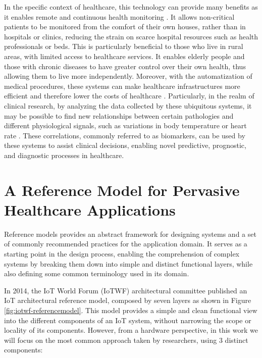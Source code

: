 In the specific context of healthcare, this technology can provide many benefits as it enables remote and continuous health monitoring \cite{Doukas2012, Wu2020, Fan2014}. It allows non-critical patients to be monitored from the comfort of their own houses, rather than in hospitals or clinics, reducing the strain on scarce hospital resources such as health professionals or beds. This is particularly beneficial to those who live in rural areas, with limited access to healthcare services. It enables elderly people and those with chronic diseases to have greater control over their own health, thus allowing them to live more independently. Moreover, with the automatization of medical procedures, these systems can make healthcare infrastructures more efficient and therefore lower the costs of healthcare \cite{Catarinucci2015, Adame2018}. Particularly, in the realm of clinical research, by analyzing the data collected by these ubiquitous systems, it may be possible to find new relationships between certain pathologies and different physiological signals, such as variations in body temperature or heart rate \cite{Choi2016}. These correlations, commonly referred to as biomarkers, can be used by these systems to assist clinical decisions, enabling novel predictive, prognostic, and diagnostic processes in healthcare.


\section{A Reference Model for Pervasive Healthcare Applications}


Reference models provides an abstract framework for designing systems and a set of commonly recommended practices for the application domain. It serves as a starting point in the design process, enabling the comprehension of complex systems by breaking them down into simple and distinct functional layers, while also defining some common terminology used in its domain. \bigskip

In 2014, the \acs{IoT} World Forum (IoTWF) architectural committee published an \acs{IoT} architectural reference model, composed by seven layers as shown in Figure \ref{fig:iotwf-referencemodel}. This model \cite{Cisco2014} provides a simple and clean functional view into the different components of an \acs{IoT} system, without narrowing the scope or locality of its components. However, from a hardware perspective, in this work we will focus on the most common approach taken by researchers, using 3 distinct components: 

